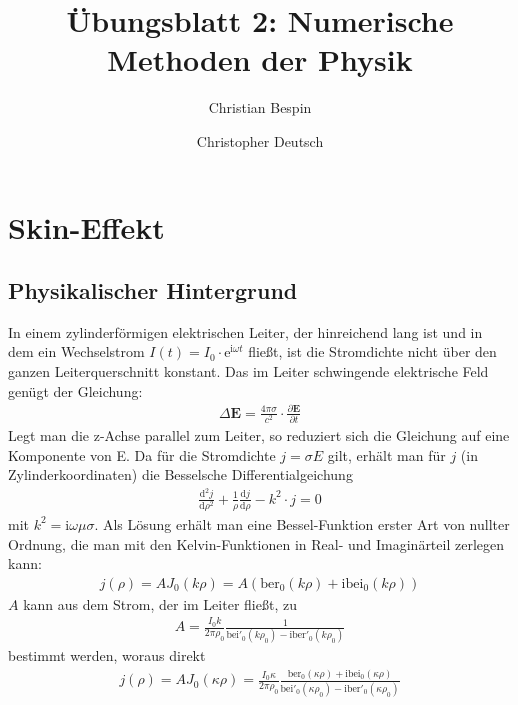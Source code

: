 \documentclass[10pt,a4paper]{article}
\author{Christian Bespin \and Christopher Deutsch}
\title{Übungsblatt 2: Numerische Methoden der Physik}
\begin{document}
\maketitle

\setcounter{section}{1}

\section{Skin-Effekt}

\subsection{Physikalischer Hintergrund}

In einem zylinderförmigen elektrischen Leiter, der hinreichend lang ist und in dem ein Wechselstrom $I(t)=I_0\cdot\text{e}^{\text{i}\omega t}$ fließt, ist die Stromdichte nicht über den ganzen Leiterquerschnitt konstant. Das im Leiter schwingende elektrische Feld genügt der Gleichung\cite{landau}:
\begin{align}
	\Delta\mathbf{E}=\frac{4\pi\sigma}{c^2}\cdot \frac{\partial \mathbf{E}}{\partial t}
	\label{eq:maxwellgleichung}
\end{align}
Legt man die z-Achse parallel zum Leiter, so reduziert sich die Gleichung auf eine Komponente von E. Da für die Stromdichte $j=\sigma E$ gilt, erhält man für $j$ (in Zylinderkoordinaten) die Besselsche Differentialgeichung
\begin{align}
	\frac{\mathrm{d}^2 j}{\mathrm{d}\rho^2} + \frac{1}{\rho}\frac{\mathrm{d}j}{\mathrm{d}\rho} - k^2\cdot j=0
	\label{eq:besseldgl} 
\end{align}
mit $k^2=\mathrm{i}\omega\mu\sigma$. Als Lösung\cite{kazimierczuk} erhält man eine Bessel-Funktion erster Art von nullter Ordnung, die man mit den Kelvin-Funktionen in Real- und Imaginärteil zerlegen kann:
\begin{align}
	j(\rho)=A J_0(k\rho)=A(\mathrm{ber}_0(k\rho)+\mathrm{i bei}_0(k\rho))
\end{align}
$A$ kann aus dem Strom, der im Leiter fließt, zu 
\begin{align}
A=\frac{I_0 k}{2\pi\rho_0}\frac{1}{\mathrm{bei}'_0(k\rho_0)-\mathrm{i ber}'_0(k\rho_0)}
\end{align}bestimmt werden\cite{kazimierczuk}, woraus direkt
\begin{align}
	j(\rho)=A J_0(\kappa\rho)=\frac{I_0 \kappa}{2\pi\rho_0}\frac{\mathrm{ber}_0(\kappa\rho)+\mathrm{i bei}_0(\kappa\rho)}{\mathrm{bei}'_0(\kappa\rho_0)-\mathrm{i ber}'_0(\kappa\rho_0)}
\end{align}
\end{document}
